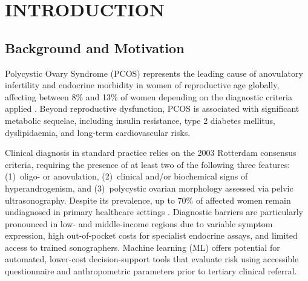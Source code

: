 \documentclass[10pt,twocolumn,a4paper]{article}
\begin{document}
\section{INTRODUCTION}

\subsection{Background and Motivation}
Polycystic Ovary Syndrome (PCOS) represents the leading cause of anovulatory infertility and endocrine
morbidity in women of reproductive age globally, affecting between 8\% and 13\% of women depending on the
diagnostic criteria applied \cite{rotterdam2004}.  Beyond reproductive dysfunction, PCOS is associated
with significant metabolic sequelae, including insulin resistance, type 2 diabetes mellitus, dyslipidaemia,
and long-term cardiovascular risks.

Clinical diagnosis in standard practice relies on the 2003 Rotterdam consensus criteria, requiring the
presence of at least two of the following three features: (1)~oligo- or anovulation, (2)~clinical and/or
biochemical signs of hyperandrogenism, and (3)~polycystic ovarian morphology assessed via pelvic ultrasonography.
Despite its prevalence, up to 70\% of affected women remain undiagnosed in primary healthcare settings \cite{zad2024}.
Diagnostic barriers are particularly pronounced in low- and middle-income regions due to variable symptom expression,
high out-of-pocket costs for specialist endocrine assays, and limited access to trained sonographers.  Machine
learning (ML) offers potential for automated, lower-cost decision-support tools that evaluate risk using accessible
questionnaire and anthropometric parameters prior to tertiary clinical referral.
\end{document}
